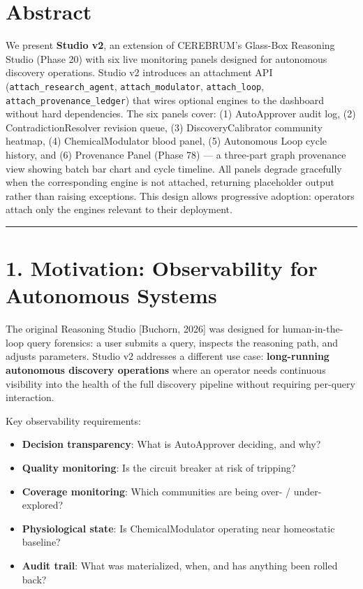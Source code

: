 
\section*{Abstract}

We present \textbf{Studio v2}, an extension of CEREBRUM's Glass-Box Reasoning Studio (Phase 20) with six live monitoring panels designed for autonomous discovery operations. Studio v2 introduces an attachment API (\texttt{attach\_research\_agent}, \texttt{attach\_modulator}, \texttt{attach\_loop}, \texttt{attach\_provenance\_ledger}) that wires optional engines to the dashboard without hard dependencies. The six panels cover: (1) AutoApprover audit log, (2) ContradictionResolver revision queue, (3) DiscoveryCalibrator community heatmap, (4) ChemicalModulator blood panel, (5) Autonomous Loop cycle history, and (6) Provenance Panel (Phase 78) --- a three-part graph provenance view showing batch bar chart and cycle timeline. All panels degrade gracefully when the corresponding engine is not attached, returning placeholder output rather than raising exceptions. This design allows progressive adoption: operators attach only the engines relevant to their deployment.

\medskip\noindent\rule{\linewidth}{0.4pt}\medskip

\section*{1. Motivation: Observability for Autonomous Systems}

The original Reasoning Studio [Buchorn, 2026] was designed for human-in-the-loop query forensics: a user submits a query, inspects the reasoning path, and adjusts parameters. Studio v2 addresses a different use case: \textbf{long-running autonomous discovery operations} where an operator needs continuous visibility into the health of the full discovery pipeline without requiring per-query interaction.

Key observability requirements:
\begin{itemize}
  \item \textbf{Decision transparency}: What is AutoApprover deciding, and why?
  \item \textbf{Quality monitoring}: Is the circuit breaker at risk of tripping?
  \item \textbf{Coverage monitoring}: Which communities are being over- / under-explored?
  \item \textbf{Physiological state}: Is ChemicalModulator operating near homeostatic baseline?
  \item \textbf{Audit trail}: What was materialized, when, and has anything been rolled back?
\end{itemize}


